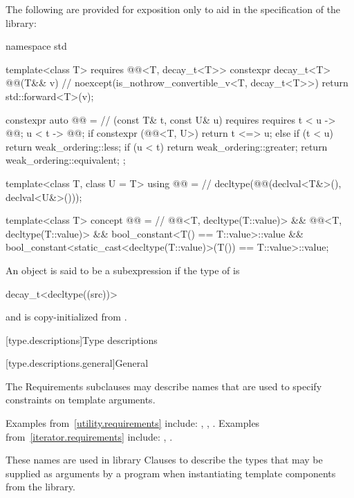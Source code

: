 \pnum
The following are provided for exposition only
to aid in the specification of the library:
%
\begin{codeblock}
namespace std {
  template<class T>
    requires @@<T, decay_t<T>>
      constexpr decay_t<T> @@(T&& v)       // \expos
        noexcept(is_nothrow_convertible_v<T, decay_t<T>>)
      { return std::forward<T>(v); }

  constexpr auto @@ =                 // (const T& t, const U& u)
      requires requires {
        { t < u } -> @@;
        { u < t } -> @@;
      }
    {
      if constexpr (@@<T, U>) {
        return t <=> u;
      } else {
        if (t < u) return weak_ordering::less;
        if (u < t) return weak_ordering::greater;
        return weak_ordering::equivalent;
      }
    };

  template<class T, class U = T>
  using @@ =                  // \expos
    decltype(@@(declval<T&>(), declval<U&>()));

  template<class T>
    concept @@ =                                 // \expos
      @@<T, decltype(T::value)> &&
      @@<T, decltype(T::value)> &&
      bool_constant<T() == T::value>::value &&
      bool_constant<static_cast<decltype(T::value)>(T()) == T::value>::value;
}
\end{codeblock}

\pnum
An object  is said to be 
a subexpression 
if the type of  is
\begin{codeblock}
decay_t<decltype((src))>
\end{codeblock} and  is copy-initialized from .

[type.descriptions]{Type descriptions}

[type.descriptions.general]{General}

\pnum
The Requirements subclauses may describe names that are used to specify
constraints on template arguments.
\begin{footnote}
Examples
from~\ref{utility.requirements} include:
,
,
.
Examples from~\ref{iterator.requirements} include:
,
.
\end{footnote}
These names are used in library Clauses
to describe the types that
may be supplied as arguments by a \Cpp{} program when instantiating template components from
the library.

